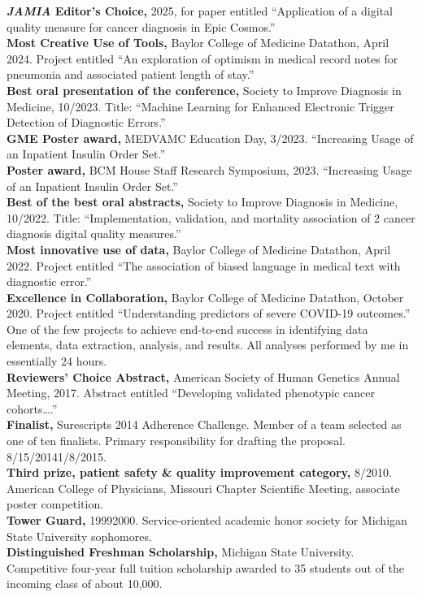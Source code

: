 \documentclass[10pt]{article}
\begin{document}
\textbf{\emph{JAMIA} Editor's Choice,} 2025, for paper entitled
``Application of a digital quality measure for cancer diagnosis in
Epic Cosmos.''\\
\textbf{Most Creative Use of Tools,} Baylor College of Medicine
Datathon, April 2024. Project entitled ``An exploration of optimism in
medical record notes for pneumonia and associated patient length of
stay.''\\
\textbf{Best oral presentation of the conference,} Society to Improve
Diagnosis in Medicine, 10/2023. Title: ``Machine Learning for Enhanced
Electronic Trigger Detection of Diagnostic Errors.''\\
\textbf{GME Poster award,} MEDVAMC Education Day, 3/2023.
``Increasing Usage of an Inpatient Insulin Order Set.''\\
\textbf{Poster award,} BCM House Staff Research Symposium, 2023.
``Increasing Usage of an Inpatient Insulin Order Set.''\\
\textbf{Best of the best oral abstracts,} Society to Improve Diagnosis
in Medicine, 10/2022. Title: ``Implementation, validation, and
mortality association of 2 cancer diagnosis digital quality
measures.''\\
\textbf{Most innovative use of data,} Baylor College of Medicine
Datathon, April 2022. Project entitled ``The association of biased
language in medical text with diagnostic error.''\\
\textbf{Excellence in Collaboration,} Baylor College of Medicine
Datathon, October 2020. Project entitled ``Understanding predictors of
severe COVID-19 outcomes.'' One of the few projects to achieve
end-to-end success in identifying data elements, data extraction,
analysis, and results. All analyses performed by me in essentially 24
hours.\\
\textbf{Reviewers' Choice Abstract,} American Society of Human
Genetics Annual Meeting, 2017. Abstract entitled ``Developing
validated phenotypic cancer cohorts\ldots{}.''\\
\textbf{Finalist,} Surescripts 2014 Adherence Challenge. Member of a
team selected as one of ten finalists. Primary responsibility for
drafting the proposal. 8/15/2014\ndash{}1/8/2015.\\
\textbf{Third prize, patient safety \& quality improvement category,}
8/2010. American College of Physicians, Missouri Chapter Scientific
Meeting, associate poster competition.\\
\textbf{Tower Guard,} 1999\ndash{}2000. Service-oriented academic
honor society for Michigan State University sophomores.\\
\textbf{Distinguished Freshman Scholarship,} Michigan State
University. Competitive four-year full tuition scholarship awarded to
35 students out of the incoming class of about 10,000.
\end{document}
